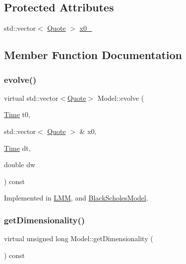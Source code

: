 \subsection*{Protected Attributes}
\begin{DoxyCompactItemize}
\item 
std\+::vector$<$ \hyperlink{_name_def_8h_a642a6c5fd87319d922637de0e0bb0305}{Quote} $>$ \hyperlink{class_model_aea7cb62b50849b8c9beef1493435241e}{x0\+\_\+}
\end{DoxyCompactItemize}


\subsection{Member Function Documentation}
\hypertarget{class_model_a087d56280bb51e8b04be3a9a30d06c76}{}\label{class_model_a087d56280bb51e8b04be3a9a30d06c76} 
\subsubsection{\texorpdfstring{evolve()}{evolve()}}
{\footnotesize\ttfamily virtual std\+::vector$<$\hyperlink{_name_def_8h_a642a6c5fd87319d922637de0e0bb0305}{Quote}$>$ Model\+::evolve (\begin{DoxyParamCaption}\item[{\hyperlink{_name_def_8h_ac2d3e0ba793497bcca555c7c2cf64ff3}{Time}}]{t0,  }\item[{std\+::vector$<$ \hyperlink{_name_def_8h_a642a6c5fd87319d922637de0e0bb0305}{Quote} $>$ \&}]{x0,  }\item[{\hyperlink{_name_def_8h_ac2d3e0ba793497bcca555c7c2cf64ff3}{Time}}]{dt,  }\item[{double}]{dw }\end{DoxyParamCaption}) const\hspace{0.3cm}{\ttfamily [pure virtual]}}



Implemented in \hyperlink{class_l_m_m_a8dfdd340048e482a8059f473b5aacfd1}{L\+MM}, and \hyperlink{class_black_scholes_model_ae7ece51fd9f0eac3f77975cff857216d}{Black\+Scholes\+Model}.

\hypertarget{class_model_acbe41cf30367bce4b96e92812d644f2d}{}\label{class_model_acbe41cf30367bce4b96e92812d644f2d} 
\subsubsection{\texorpdfstring{get\+Dimensionality()}{getDimensionality()}}
{\footnotesize\ttfamily virtual unsigned long Model\+::get\+Dimensionality (\begin{DoxyParamCaption}{ }\end{DoxyParamCaption}) const\hspace{0.3cm}{\ttfamily [pure virtual]}}



